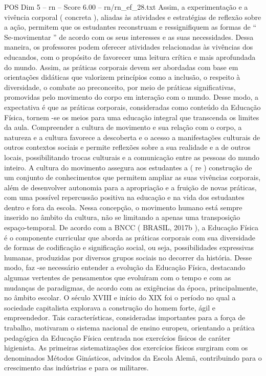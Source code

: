 \begin{textsample}{POS Dim 5 – rn – Score 6.00 – rn/rn\_ef\_28.txt}
Assim, a experimentação e a vivência corporal ( concreta ), aliadas às atividades e estratégias de reflexão sobre a ação, permitem que os estudantes reconstruam e ressignifiquem as formas de “ Se-movimentar ” de acordo com os seus interesses e as suas necessidades.
Dessa maneira, os professores podem oferecer atividades relacionadas às vivências dos educandos, com o propósito de favorecer uma leitura crítica e mais aprofundada do mundo.
Assim, as práticas corporais devem ser abordadas com base em orientações didáticas que valorizem princípios como a inclusão, o respeito à diversidade, o combate ao preconceito, por meio de práticas significativas, promovidas pelo movimento do corpo em interação com o mundo.
Desse modo, a expectativa é que as práticas corporais, consideradas como conteúdo da Educação Física, tornem -se os meios para uma educação integral que transcenda os limites da aula.
Compreender a cultura de movimento e sua relação com o corpo, a natureza e a cultura favorece a descoberta e o acesso a manifestações culturais de outros contextos sociais e permite reflexões sobre a sua realidade e a de outros locais, possibilitando trocas culturais e a comunicação entre as pessoas do mundo inteiro.
A cultura do movimento assegura aos estudantes a ( re ) construção de um conjunto de conhecimentos que permitem ampliar as suas vivências corporais, além de desenvolver autonomia para a apropriação e a fruição de novas práticas, com uma possível repercussão positiva na educação e na vida dos estudantes dentro e fora da escola.
Nessa concepção, o movimento humano está sempre inserido no âmbito da cultura, não se limitando a apenas uma transposição espaço-temporal.
De acordo com a BNCC ( BRASIL, 2017b ), a Educação Física é o componente curricular que aborda as práticas corporais com sua diversidade de formas de codificação e significação social, ou seja, possibilidades expressivas humanas, produzidas por diversos grupos sociais no decorrer da história.
Desse modo, faz -se necessário entender a evolução da Educação Física, destacando algumas vertentes de pensamentos que evoluíram com o tempo e com as mudanças de paradigmas, de acordo com as exigências da época, principalmente, no âmbito escolar.
O século XVIII e início do XIX foi o período no qual a sociedade capitalista explorava a construção do homem forte, ágil e empreendedor.
Tais características, consideradas importantes para a força de trabalho, motivaram o sistema nacional de ensino europeu, orientando a prática pedagógica da Educação Física centrada nos exercícios físicos de caráter higienista.
As primeiras sistematizações dos exercícios físicos surgiram com os denominados Métodos Ginásticos, advindos da Escola Alemã, contribuindo para o crescimento das indústrias e para os militares.

\end{textsample}
